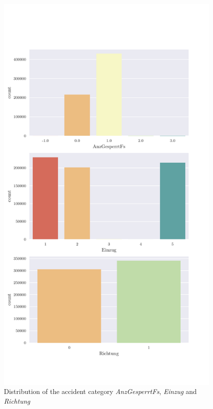     \begin{figure}[ht!]
        \centering
        \includegraphics[scale=0.7]{CorrAnalysis/data/ArbIS/01_dataset/plots/arbis_dataset_count_multiple01}
        \caption{Distribution of the accident category \textit{AnzGesperrtFs}, \textit{Einzug} and \textit{Richtung}}
        \label{img:arbis_dataset_AnzGesperrtFs}
        \label{img:arbis_dataset_Einzug}
        \label{img:arbis_dataset_Richtung}
    \end{figure}


